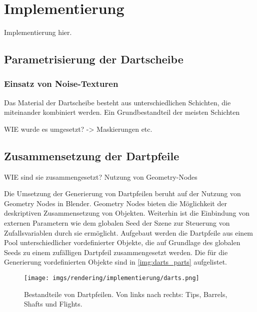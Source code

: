 
\section{Implementierung}
\label{sec:daten:implementierung}

Implementierung hier.



\subsection{Parametrisierung der Dartscheibe}  %
\label{sec:dartscheibe_parametrisierung}

\subsubsection{Einsatz von Noise-Texturen}

Das Material der Dartscheibe besteht aus unterschiedlichen Schichten, die miteinander kombiniert werden. Ein Grundbestandteil der meisten Schichten 

WIE wurde es umgesetzt? -> Maskierungen etc.

\todo{}

\subsection{Zusammensetzung der Dartpfeile}  %
\label{sec:dartpfeile_zusammensetzung}

WIE sind sie zusammengesetzt? Nutzung von Geometry-Nodes

Die Umsetzung der Generierung von Dartpfeilen beruht auf der Nutzung von Geometry Nodes in Blender. Geometry Nodes bieten die Möglichkeit der deskriptiven Zusammensetzung von Objekten. Weiterhin ist die Einbindung von externen Parametern wie dem globalen Seed der Szene zur Steuerung von Zufallsvariablen durch sie ermöglicht. Aufgebaut werden die Dartpfeile aus einem Pool unterschiedlicher vordefinierter Objekte, die auf Grundlage des globalen Seeds zu einem zufälligen Dartpfeil zusammengesetzt werden. Die für die Generierung vordefinierten Objekte sind in \autoref{img:darts_parts} aufgelistet.

\begin{figure}
    \centering
    \texttt{[image: imgs/rendering/implementierung/darts.png]}
    \caption{Bestandteile von Dartpfeilen. Von links nach rechts: Tips, Barrels, Shafts und Flights.}
    \label{img:darts_parts}
\end{figure}

